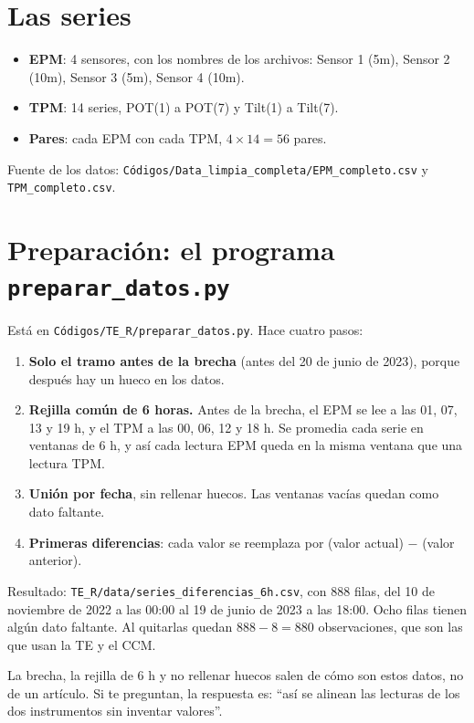 \documentclass[11pt,openany]{book}
\newcommand{\archivo}[1]{\texttt{\small #1}}
\begin{document}
\section{Las series}

\begin{itemize}
\item \textbf{EPM}: 4 sensores, con los nombres de los archivos: Sensor 1 (5m), Sensor 2 (10m), Sensor 3 (5m), Sensor 4 (10m).
\item \textbf{TPM}: 14 series, POT(1) a POT(7) y Tilt(1) a Tilt(7).
\item \textbf{Pares}: cada EPM con cada TPM, $4 \times 14 = 56$ pares.
\end{itemize}

Fuente de los datos: \archivo{Códigos/Data\_limpia\_completa/EPM\_completo.csv} y \archivo{TPM\_completo.csv}.

\section{Preparación: el programa \texttt{preparar\_datos.py}}

Está en \archivo{Códigos/TE\_R/preparar\_datos.py}. Hace cuatro pasos:

\begin{enumerate}
\item \textbf{Solo el tramo antes de la brecha} (antes del 20 de junio de 2023), porque después hay un hueco en los datos.
\item \textbf{Rejilla común de 6 horas.} Antes de la brecha, el EPM se lee a las 01, 07, 13 y 19 h, y el TPM a las 00, 06, 12 y 18 h. Se promedia cada serie en ventanas de 6 h, y así cada lectura EPM queda en la misma ventana que una lectura TPM.
\item \textbf{Unión por fecha}, sin rellenar huecos. Las ventanas vacías quedan como dato faltante.
\item \textbf{Primeras diferencias}: cada valor se reemplaza por (valor actual) $-$ (valor anterior).
\end{enumerate}

Resultado: \archivo{TE\_R/data/series\_diferencias\_6h.csv}, con 888 filas, del 10 de noviembre de 2022 a las 00:00 al 19 de junio de 2023 a las 18:00. Ocho filas tienen algún dato faltante. Al quitarlas quedan $888 - 8 = 880$ observaciones, que son las que usan la TE y el CCM.

\begin{ojo}
La brecha, la rejilla de 6 h y no rellenar huecos salen de cómo son estos datos, no de un artículo. Si te preguntan, la respuesta es: ``así se alinean las lecturas de los dos instrumentos sin inventar valores''.
\end{ojo}
\end{document}
